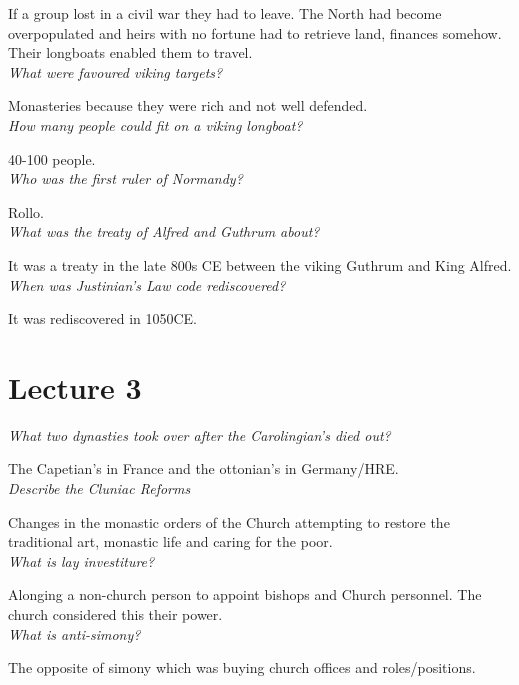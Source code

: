 \documentclass[12pt]{article}
\begin{document}
If a group lost in a civil war they had to leave. The North had become overpopulated and heirs with no fortune had to retrieve land, finances somehow. Their longboats enabled them to travel.\\

\textit{What were favoured viking targets?}

Monasteries because they were rich and not well defended.\\

\textit{How many people could fit on a viking longboat?}

40-100 people.\\


\textit{Who was the first ruler of Normandy?}

Rollo.\\

\textit{What was the treaty of Alfred and Guthrum about?}

It was a treaty in the late 800s CE between the viking Guthrum and King Alfred.\\

\textit{When was Justinian's Law code rediscovered?}

It was rediscovered in 1050CE. \\

\section*{Lecture 3}

\textit{What two dynasties took over after the Carolingian's died out?}

The Capetian's in France and the ottonian's in Germany/HRE.\\


\textit{Describe the Cluniac Reforms}

Changes in the monastic orders of the Church attempting to restore the traditional art, monastic life and caring for the poor.\\

\textit{What is lay investiture?}

Alonging a non-church person to appoint bishops and Church personnel. The church considered this their power.\\

\textit{What is anti-simony?}

The opposite of simony which was buying church offices and roles/positions.\\
\end{document}
